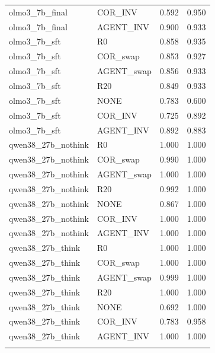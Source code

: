 \begin{small}
\begin{tabular}{llrr}
olmo3\_7b\_final & COR\_INV & 0.592 & 0.950 \\
olmo3\_7b\_final & AGENT\_INV & 0.900 & 0.933 \\
olmo3\_7b\_sft & R0 & 0.858 & 0.935 \\
olmo3\_7b\_sft & COR\_swap & 0.853 & 0.927 \\
olmo3\_7b\_sft & AGENT\_swap & 0.856 & 0.933 \\
olmo3\_7b\_sft & R20 & 0.849 & 0.933 \\
olmo3\_7b\_sft & NONE & 0.783 & 0.600 \\
olmo3\_7b\_sft & COR\_INV & 0.725 & 0.892 \\
olmo3\_7b\_sft & AGENT\_INV & 0.892 & 0.883 \\
qwen38\_27b\_nothink & R0 & 1.000 & 1.000 \\
qwen38\_27b\_nothink & COR\_swap & 0.990 & 1.000 \\
qwen38\_27b\_nothink & AGENT\_swap & 1.000 & 1.000 \\
qwen38\_27b\_nothink & R20 & 0.992 & 1.000 \\
qwen38\_27b\_nothink & NONE & 0.867 & 1.000 \\
qwen38\_27b\_nothink & COR\_INV & 1.000 & 1.000 \\
qwen38\_27b\_nothink & AGENT\_INV & 1.000 & 1.000 \\
qwen38\_27b\_think & R0 & 1.000 & 1.000 \\
qwen38\_27b\_think & COR\_swap & 1.000 & 1.000 \\
qwen38\_27b\_think & AGENT\_swap & 0.999 & 1.000 \\
qwen38\_27b\_think & R20 & 1.000 & 1.000 \\
qwen38\_27b\_think & NONE & 0.692 & 1.000 \\
qwen38\_27b\_think & COR\_INV & 0.783 & 0.958 \\
qwen38\_27b\_think & AGENT\_INV & 1.000 & 1.000 \\
\botrule
\end{tabular}\end{small}
